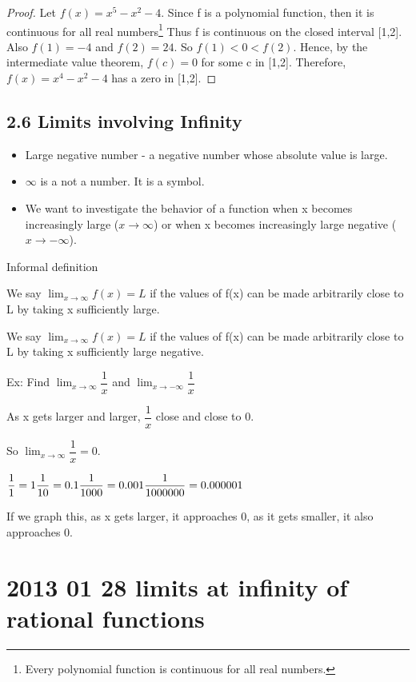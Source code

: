 \documentclass[12pt]{article}
\begin{document}
\begin{proof}
Let $f(x) = x^5 - x^2 - 4$. Since f is a polynomial function, then it is continuous for all real
numbers\footnote{Every polynomial function is continuous for all real numbers.} Thus f is continuous on the
closed interval [1,2]. Also $f(1) = -4$ and $f(2) = 24$. So $f(1) < 0 < f(2)$. Hence, by the intermediate
value theorem, $f(c) = 0$ for some c in [1,2]. Therefore, $f(x) = x^4 - x^2-4$ has a zero in [1,2].
\end{proof}

\subsection{2.6 Limits involving Infinity}
\begin{itemize}
\item Large negative number - a negative number whose absolute value is large.
\item $\infty$ is a not a number. It is a symbol.
\item We want to investigate the behavior of a function when x becomes increasingly large ($x \to \infty$) or when
  x becomes increasingly large negative ($x \to -\infty$).
\end{itemize}

Informal definition

We say $\lim_{x\to\infty} f(x) = L$ if the values of f(x) can be made arbitrarily close to L by taking x
sufficiently large.

We say $\lim_{x\to\infty}f(x)=L$ if the values of f(x) can be made arbitrarily close to L by taking x
sufficiently large negative.

Ex: Find $\lim_{x\to\infty}\dfrac{1}{x}$ and $\lim_{x\to -\infty}\dfrac{1}{x}$

As x gets larger and larger, $\dfrac{1}{x}$ close and close to 0.

So $\lim_{x\to\infty}\dfrac{1}{x}=0$.

$
\dfrac{1}{1} = 1\\
\dfrac{1}{10}= 0.1\\
\dfrac{1}{1000}=0.001\\
\dfrac{1}{1000000}=0.000001
$

If we graph this, as x gets larger, it approaches 0, as it gets smaller, it also approaches 0.

\section{2013 01 28 limits at infinity of rational functions}
\end{document}

